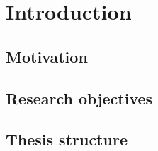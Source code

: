 \chapter{Introduction}
\label{chap:chap1}

    

\section{Motivation}
\section{Research objectives}
\section{Thesis structure}


